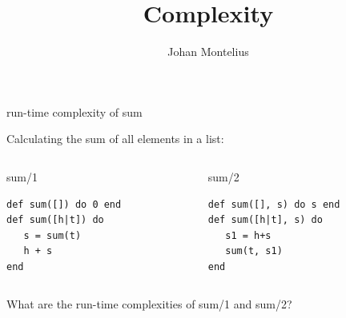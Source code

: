

\title[ID1019 Complexity]{Complexity}


\author{Johan Montelius}
\date{\semester}



\begin{frame}
\titlepage
\end{frame}

\begin{frame}[fragile]{run-time complexity of sum}

Calculating the sum of all elements in a list:

\pause\vspace{20pt}

\begin{columns}
   \begin{column}{.5\linewidth}
     \begin{block}{sum/1}
       \begin{verbatim}
def sum([]) do 0 end
def sum([h|t]) do 
   s = sum(t)
   h + s
end
       \end{verbatim}
      \end{block}
    \end{column}
\pause
    \begin{column}{.5\linewidth}
     \begin{block}{sum/2}
       \begin{verbatim}
def sum([], s) do s end
def sum([h|t], s) do
   s1 = h+s 
   sum(t, s1)
end
       \end{verbatim}
      \end{block}
    \end{column}
  \end{columns}

\pause\vspace{20pt}
What are the run-time complexities of sum/1 and sum/2?

\end{frame}

